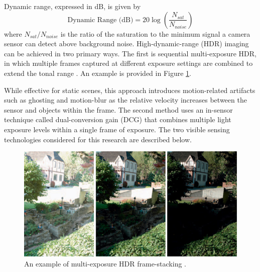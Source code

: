 \documentclass{erauthesis}
\begin{document}
Dynamic range, expressed in dB, is given by
\begin{equation}
 \text{Dynamic Range (dB)} = 20 \log{\left( \frac{N_{sat}}{N_{noise}}\right) }
\end{equation}
where $N_{sat}/N_{noise}$ is the ratio of the saturation to the minimum signal a camera sensor can detect above background noise.
High-dynamic-range (HDR) imaging can be achieved in two primary ways. 
The first is sequential multi-exposure \ac{HDR}, in which multiple frames captured at different exposure settings are combined to extend the tonal range \cite{Reinhard2010}. An example is provided in Figure \ref{fig:hdr_example}.



While effective for static scenes, this approach introduces motion-related artifacts such as ghosting and motion-blur as the relative velocity increases between the sensor and objects within the frame.
The second method uses an in-sensor technique called dual-conversion gain (DCG) that combines multiple light exposure levels within a single frame of exposure. 
The two visible sensing technologies considered for this research are described below.

\begin{figure}[htbp]
    \centering
    \includegraphics[width=0.65\linewidth]{Images/hdr_example.png}
    \caption{An example of multi-exposure HDR frame-stacking \cite{Reinhard2010}.}
    \label{fig:hdr_example}
\end{figure}
\end{document}
